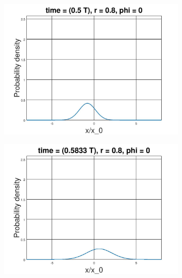 \documentclass[12pt, twoside]{article}
\begin{document}
\begin{figure}[h!]
\begin{subfigure}[h!]{0.3\linewidth}
	\end{subfigure}
	\begin{subfigure}[h!]{0.3\linewidth}
		\includegraphics[width=\linewidth]{graphs/squeeze_0.8/6.jpg}
	\end{subfigure}
	\begin{subfigure}[h!]{0.3\linewidth}
		\includegraphics[width=\linewidth]{graphs/squeeze_0.8/7.jpg}
	\end{subfigure}
	\begin{subfigure}[h!]{0.3\linewidth}

\end{subfigure}
\end{figure}
\end{document}
